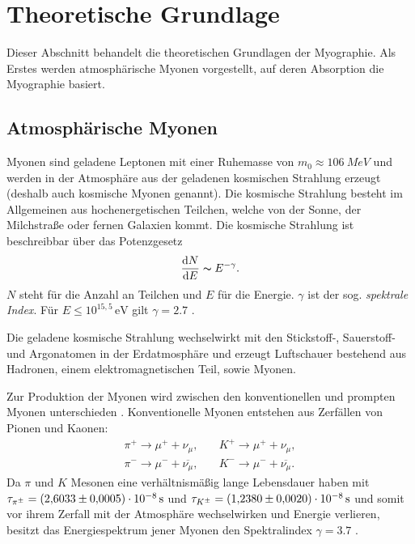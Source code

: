 \chapter{Theoretische Grundlage}
\label{sec:theorie}


Dieser Abschnitt behandelt die theoretischen Grundlagen der Myographie.
Als Erstes werden atmosphärische Myonen vorgestellt, auf deren Absorption
die Myographie basiert. 

\section{Atmosphärische Myonen}

Myonen sind geladene Leptonen mit einer Ruhemasse von 
$m_{0} \approx \SI[]{106}[]{MeV}$ 
\cite{PDG2020}
und werden in der Atmosphäre aus der 
geladenen kosmischen Strahlung erzeugt (deshalb auch
kosmische Myonen genannt).
Die kosmische Strahlung besteht im Allgemeinen aus hochenergetischen Teilchen,
welche von der Sonne, der Milchstraße oder fernen Galaxien kommt.
Die kosmische Strahlung ist beschreibbar über das Potenzgesetz   
\begin{equation*}
    \frac{\mathrm{d}N}{\mathrm{d}E}\thicksim E^{-\gamma}.
\end{equation*}
$N$ steht für die Anzahl an Teilchen und $E$ für die Energie.
$\gamma$ ist der sog. \textit{spektrale Index}. 
Für $E \leq 10^{15,5}\,\mathrm{eV}$ gilt $\gamma = \num{2,7}$ \cite{Gaisser16CR}. 

Die geladene kosmische Strahlung wechselwirkt mit den Stickstoff-, Sauerstoff- und 
Argonatomen in der Erdatmosphäre und erzeugt Luftschauer bestehend aus Hadronen, 
einem elektromagnetischen Teil, sowie Myonen.

Zur Produktion der Myonen wird zwischen den konventionellen 
und prompten Myonen unterschieden \cite{Gaisser16CR}.
Konventionelle Myonen entstehen aus Zerfällen von Pionen und Kaonen:
\begin{align*}
    \pi^{+} \to \mu^{+} + \nu_{\mu},\quad  & K^{+} \to \mu^{+} + \nu_{\mu}, \\
    \pi^{-} \to \mu^{-} + \overline{\nu_{\mu}},\quad  & K^{-} \to \mu^{-} + \overline{\nu_{\mu}}.
\end{align*}
Da $\pi$ und $K$ Mesonen eine verhältnismäßig lange Lebensdauer 
haben mit \\ 
$\tau_{\pi^{\pm}} = \SI[]{2.6033 \pm 0.0005 e-8}[]{s}$ und 
$\tau_{K^{\pm}}  = \SI[]{1.2380 \pm 0.0020 e-8}[]{s}$
und somit vor ihrem Zerfall 
mit der Atmosphäre wechselwirken und Energie verlieren,
besitzt das Energiespektrum jener Myonen den Spektralindex $\gamma=\num[]{3,7}$ \cite{Gaisser16CR}.


